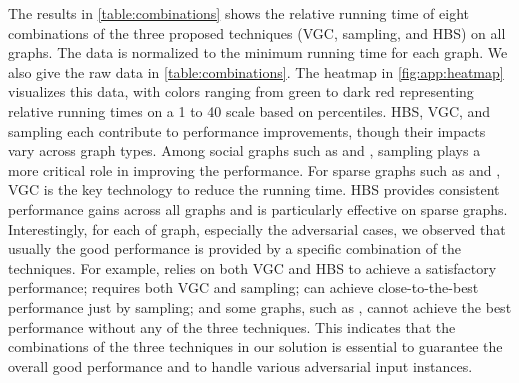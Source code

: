 {The results in \cref{table:combinations} shows the relative running time of eight combinations of the three proposed techniques (VGC, sampling, and HBS) on all graphs. The data is normalized to the minimum running time for each graph. We also give the raw data in \cref{table:combinations}. 
The heatmap in \cref{fig:app:heatmap} visualizes this data, 
with colors ranging from green to dark red representing relative running times on a 1 to 40 scale based on percentiles.
HBS, VGC, and sampling each contribute to performance improvements, though their impacts vary across graph types.
Among social graphs such as \TW and \CW, sampling plays a more critical role in improving the performance.
For sparse graphs such as \GL and \COS, VGC is the key technology to reduce the running time.
HBS provides consistent performance gains across all graphs and is particularly effective on sparse graphs. 
Interestingly, for each of graph, especially the adversarial cases, we observed that usually the good performance is provided by a specific combination of the techniques. For example, \CBC{} relies on both VGC and HBS to achieve a satisfactory performance; \SD{} requires both VGC and sampling; \HPL{} can achieve close-to-the-best performance just by sampling; and some graphs, such as \EH{}, cannot achieve the best performance without any of the three techniques. This indicates that the combinations of the three techniques in our solution is essential to guarantee the overall good performance and to handle various adversarial input instances. 

\clearpage


 
} 